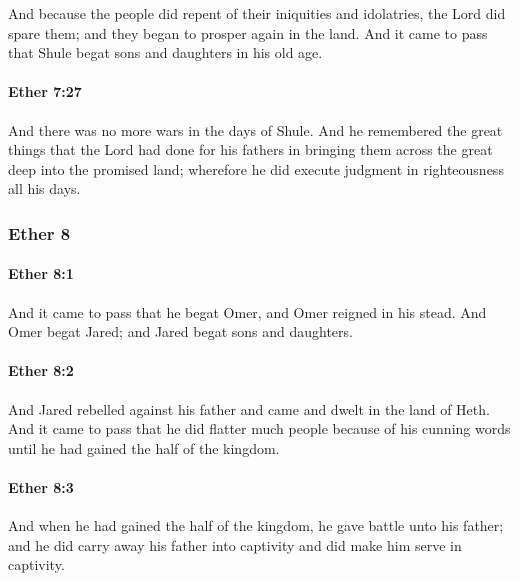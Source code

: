 			And because the people did repent of their iniquities and idolatries,
			the Lord did spare them;
			and they began to prosper again in the land.
			And it came to pass that Shule begat sons and daughters in his old age.

		\paragraph{Ether 7:27} %
			\label{ETHER-7-27}

			And there was no more wars in the days of Shule.
			And he remembered the great things that the Lord had done for his fathers
			in bringing them across the great deep into the promised land;
			wherefore he did execute judgment in righteousness all his days.

	\subsubsection{Ether 8} %
		\label{ETHER-8}
		
		\paragraph{Ether 8:1} %
			\label{ETHER-8-1}

			And it came to pass that he begat Omer,
			and Omer reigned in his stead.
			And Omer begat Jared;
			and Jared begat sons and daughters.

		\paragraph{Ether 8:2} %
			\label{ETHER-8-2}

			And Jared rebelled against his father
			and came and dwelt in the land of Heth.
			And it came to pass that he did flatter much people
			because of his cunning words
			until he had gained the half of the kingdom.

		\paragraph{Ether 8:3} %
			\label{ETHER-8-3}

			And when he had gained the half of the kingdom,
			he gave battle unto his father;
			and he did carry away his father into captivity
			and did make him serve in captivity.

